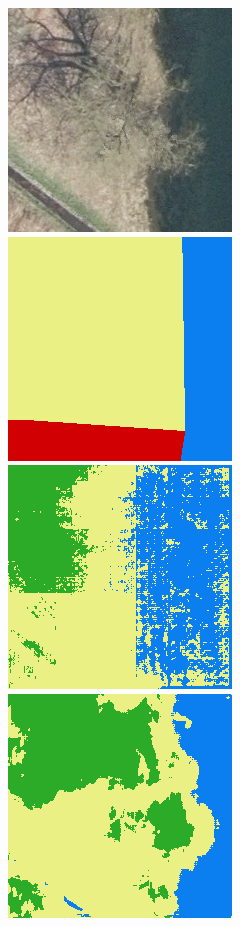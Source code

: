 \begin{figure}
    \vspace{3mm}
    \includegraphics[width=\DensenetPredictionsImageWidth]{images/densenet/626312-image} \hfill
    \includegraphics[width=\DensenetPredictionsImageWidth]{images/densenet/626312-label} \hfill
    \includegraphics[width=\DensenetPredictionsImageWidth]{images/densenet/densenet-103D/626312-prediction} \hfill
    \includegraphics[width=\DensenetPredictionsImageWidth]{images/densenet/densenet-103CD/626312-prediction} \hfill

\end{figure}
